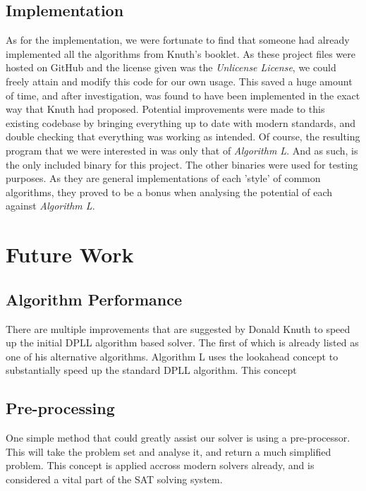 \documentclass{article}
\begin{document}
\subsection{Implementation}
As for the implementation, we were fortunate to find that someone had already implemented all the algorithms from Knuth's booklet.
As these project files were hosted on GitHub\cite{aaw} and the license given was the \textit{Unlicense License}, we could freely
attain and modify this code for our own usage. This saved a huge amount of time, and after investigation, was found to have been
implemented in the exact way that Knuth had proposed. Potential improvements were made to this existing codebase by bringing
everything up to date with modern standards, and double checking that everything was working as intended. Of course, the resulting
program that we were interested in was only that of \textit{Algorithm L}. And as such, is the only included binary for this
project. The other binaries were used for testing purposes. As they are general implementations of each 'style' of common
algorithms, they proved to be a bonus when analysing the potential of each against \textit{Algorithm L}.

\section{Future Work}

\subsection{Algorithm Performance}
There are multiple improvements that are suggested by Donald Knuth to speed up the initial DPLL algorithm based solver. The first 
of which is already listed as one of his alternative algorithms. Algorithm L uses the lookahead concept to substantially speed up 
the standard DPLL algorithm. This concept %

\subsection{Pre-processing}
One simple method that could greatly assist our solver is using a pre-processor. This will take the problem set and analyse it, 
and return a much simplified problem. This concept is applied accross modern solvers already, and is considered a vital part of 
the SAT solving system.
\end{document}
